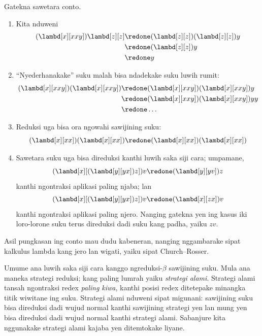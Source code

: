 \documentclass[../../../include/open-logic-section]{subfiles}
\begin{document}
Gatekna sawetara conto.
\begin{enumerate}
\item Kita nduweni
\begin{align*}
(\lambd[x][xxy]) \lambd[z][z] & \redone (\lambd[z][z])(\lambd[z][z]) y \\
& \redone (\lambd[z][z]) y \\
& \redone y
\end{align*}
\item ``Nyederhanakake'' suku
  malah bisa ndadekake suku
  luwih rumit:
\begin{align*}
(\lambd[x][xxy])(\lambd[x][xxy]) & \redone (\lambd[x][xxy])(\lambd[x][xxy])y \\
& \redone (\lambd[x][xxy])(\lambd[x][xxy])yy \\
& \redone \dots
\end{align*}
\item Reduksi uga bisa
  ora ngowahi sawijining suku:
\[
(\lambd[x][xx])(\lambd[x][xx]) \redone (\lambd[x][xx])(\lambd[x][xx])
\]
\item Sawetara suku uga bisa
  direduksi kanthi luwih saka siji
  cara; umpamane,
\[
(\lambd[x][(\lambd[y][yx]) z]) v \redone (\lambd[y][yv]) z
\]
kanthi ngontraksi aplikasi
paling njaba; lan
\[
(\lambd[x][(\lambd[y][yx]) z]) v \redone (\lambd[x][zx]) v
\]
kanthi ngontraksi aplikasi
paling njero. Nanging gatekna
yen ing kasus iki loro-lorone
suku terus direduksi dadi suku
kang padha, yaiku $zv$.
\end{enumerate}

Asil pungkasan ing conto mau
dudu kabeneran, nanging
nggambarake sipat kalkulus lambda
kang jero lan wigati,
yaiku sipat Church--Rosser.

\begin{digress}
  Umume ana luwih saka siji
  cara kanggo ngreduksi-$\beta$
  sawijining suku. Mula ana
  maneka strategi reduksi;
  kang paling lumrah yaiku
  \emph{strategi alami}.
  Strategi alami tansah ngontraksi
  redex \emph{paling kiwa},
  kanthi posisi redex ditetepake
  minangka titik wiwitane
  ing suku. Strategi alami nduweni
  sipat migunani: sawijining suku
  bisa direduksi dadi wujud normal
  kanthi sawijining strategi
  yen lan mung yen bisa direduksi
  dadi wujud normal kanthi
  strategi alami. Sabanjure
  kita nggunakake strategi alami
  kajaba yen ditemtokake liyane.
\end{digress}
\end{document}
